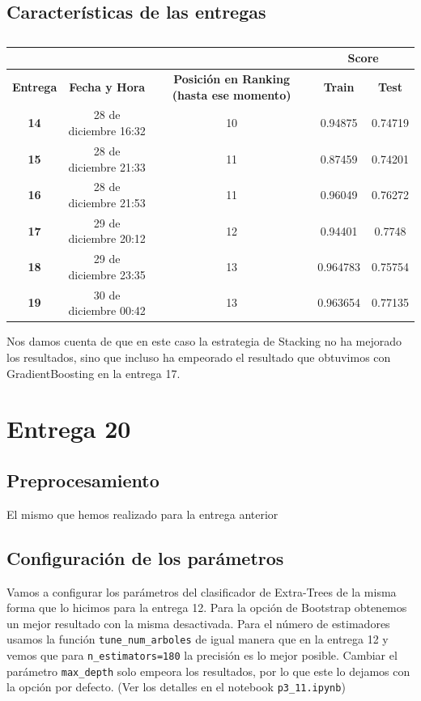 \documentclass[a4paper,11pt]{article}
\begin{document}
  \subsection{Características de las entregas}
  \begin{table}[htbp]
  	\caption{}\begin{center}
  	\begin{tabular}{|c|c|c|c|c|}
  		\hline
  		\multicolumn{1}{|l|}{\textbf{}} & \textbf{} & \textbf{} & \multicolumn{ 2}{c|}{\textbf{Score}} \\ \hline
  		\textbf{Entrega} & \textbf{Fecha y Hora} & \textbf{Posición en Ranking (hasta ese momento)} & \textbf{Train} & \textbf{Test} \\ \hline
  		\textbf{14} & 28 de diciembre 16:32  & 10 & 0.94875 & 0.74719 \\ \hline
  		\textbf{15} & 28 de diciembre 21:33  & 11 & 0.87459 & 0.74201 \\ \hline
  		\textbf{16} & 28 de diciembre 21:53 & 11 & 0.96049 & 0.76272 \\ \hline
  		\textbf{17} & 29 de diciembre 20:12 & 12 & 0.94401 & 0.7748 \\ \hline
  		\textbf{18} & 29 de diciembre 23:35  & 13 & 0.964783 & 0.75754 \\ \hline
  		\textbf{19} & 30 de diciembre 00:42  & 13 & 0.963654 & 0.77135 \\ \hline
  	\end{tabular}\end{center}
  	\label{}
  \end{table}
  
  Nos damos cuenta de que en este caso la estrategia de Stacking no ha mejorado los resultados, sino que incluso ha empeorado el resultado que obtuvimos con GradientBoosting en la entrega 17. 
  
  \section{Entrega 20}
  \subsection{Preprocesamiento}
  El mismo que hemos realizado para la entrega anterior
  \subsection{Configuración de los parámetros}
  Vamos a configurar los parámetros del clasificador de Extra-Trees de la misma forma que lo hicimos para la entrega 12. Para la opción de Bootstrap obtenemos un mejor resultado con la misma desactivada. Para el número de estimadores usamos la función \texttt{tune_num_arboles} de igual manera que en la entrega 12 y vemos que para \texttt{n_estimators=180} la precisión es lo mejor posible. Cambiar el parámetro \texttt{max_depth} solo empeora los resultados, por lo que este lo dejamos con la opción por defecto. (Ver los detalles en el notebook \texttt{p3_11.ipynb})
  
\end{document}
